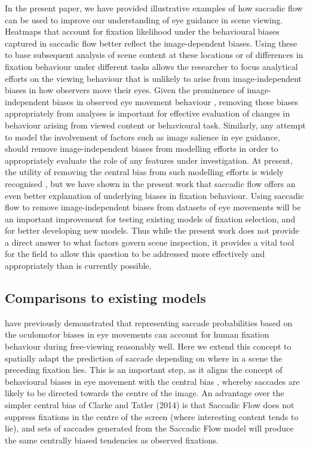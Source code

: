 \documentclass[a4paper, twocolumn, oneside, 11pt]{article}
\begin{document}
In the present paper, we have provided illustrative examples of how saccadic flow can be used to improve our understanding of eye guidance in scene viewing. Heatmaps that account for fixation likelihood under the behavioural biases captured in saccadic flow better reflect the image-dependent biases. Using these to base subsequent analysis of scene content at these locations or of differences in fixation behaviour under different tasks allows the researcher to focus analytical efforts on the viewing behaviour that is unlikely to arise from image-independent biases in how observers move their eyes. Given the prominence of image-independent biases in observed eye movement behaviour \cite{tatler-vincent2009}, removing these biases appropriately from analyses is important for effective evaluation of changes in behaviour arising from viewed content or behavioural task. Similarly, any attempt to model the involvement of factors such as image salience in eye guidance, should remove image-independent biases from modelling efforts in order to appropriately evaluate the role of any features under investigation. At present, the utility of removing the central bias from such modelling efforts is widely recognised \citep{borji2013,Tatler2011}, but we have shown in the present work that saccadic flow offers an even better explanation of underlying biases in fixation behaviour. Using saccadic flow to remove image-independent biases from datasets of eye movements will be an important improvement for testing existing models of fixation selection, and for better developing new models. Thus while the present work does not provide a direct answer to what factors govern scene inspection, it provides a vital tool for the field to allow this question to be addressed more effectively and appropriately than is currently possible.

\subsection{Comparisons to existing models}
\citep{tatler-vincent2009} have previously demonstrated that representing saccade probabilities based on the oculomotor biases in eye movements can account for human fixation behaviour during free-viewing reasonably well. Here we extend this concept to spatially adapt the prediction of saccade depending on where in a scene the preceding fixation lies. This is an important step, as it aligns the concept of behavioural biases in eye movement with the central bias \citep{tatler2007}, whereby saccades are likely to be directed towards the centre of the image. An advantage over the simpler central bias of Clarke and Tatler (2014) is that Saccadic Flow does not suppress fixations in the centre of the screen (where interesting content tends to lie), and sets of saccades generated from the Saccadic Flow model will produce the same centrally biased tendencies as observed fixations.
\end{document}
